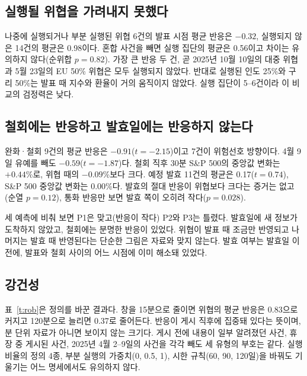\documentclass[11pt,a4paper]{article}
\begin{document}
\subsection{실행될 위협을 가려내지 못했다}

나중에 실행되거나 부분 실행된 위협 6건의 발표 시점 평균 반응은 $-0.32$, 실행되지 않은 14건의 평균은 0.98이다. 혼합 사건을 빼면 실행 집단의 평균은 0.56이고 차이는 유의하지 않다(순위합 $p=0.82$). 가장 큰 반응 두 건, 곧 2025년 10월 10일의 대중 위협과 5월 23일의 EU 50\% 위협은 모두 실행되지 않았다. 반대로 실행된 인도 25\%와 구리 50\%는 발표 때 지수와 환율이 거의 움직이지 않았다. 실행 집단이 5--6건이라 이 비교의 검정력은 낮다.

\subsection{철회에는 반응하고 발효일에는 반응하지 않는다}

완화·철회 9건의 평균 반응은 $-0.91$($t=-2.15$)이고 7건이 위험선호 방향이다. 4월 9일 유예를 빼도 $-0.59$($t=-1.87$)다. 철회 직후 30분 S\&P 500의 중앙값 변화는 $+0.44$\%로, 위협 때의 $-0.09$\%보다 크다. 예정 발효 11건의 평균은 0.17($t=0.74$), S\&P 500 중앙값 변화는 0.00\%다. 발효의 절대 반응이 위협보다 크다는 증거는 없고(순열 $p=0.12$), 통화 반응만 보면 발효 쪽이 오히려 작다($p=0.028$).

세 예측에 비춰 보면 P1은 맞고(반응이 작다) P2와 P3는 틀렸다. 발효일에 새 정보가 도착하지 않았고, 철회에는 분명한 반응이 있었다. 위협이 발표 때 조금만 반영되고 나머지는 발효 때 반영된다는 단순한 그림은 자료와 맞지 않는다. 발효 여부는 발효일 이전에, 발표와 철회 사이의 어느 시점에 이미 해소돼 있었다.

\subsection{강건성}

표~\ref{t:rob}은 정의를 바꾼 결과다. 창을 15분으로 줄이면 위협의 평균 반응은 0.83으로 커지고 120분으로 늘리면 0.37로 줄어든다. 반응이 게시 직후에 집중돼 있다는 뜻이며, 분 단위 자료가 아니면 보이지 않는 크기다. 게시 전에 내용이 일부 알려졌던 사건, 휴장 중 게시된 사건, 2025년 4월 2--9일의 사건을 각각 빼도 세 유형의 부호는 같다. 실행 비율의 정의 4종, 부분 실행의 가중치(0, 0.5, 1), 시한 규칙(60, 90, 120일)을 바꿔도 기울기는 어느 명세에서도 유의하지 않다.
\end{document}
